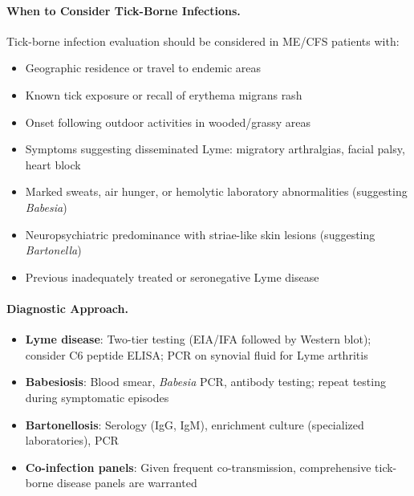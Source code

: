 \paragraph{When to Consider Tick-Borne Infections.}
Tick-borne infection evaluation should be considered in ME/CFS patients with:
\begin{itemize}
    \item Geographic residence or travel to endemic areas
    \item Known tick exposure or recall of erythema migrans rash
    \item Onset following outdoor activities in wooded/grassy areas
    \item Symptoms suggesting disseminated Lyme: migratory arthralgias, facial palsy, heart block
    \item Marked sweats, air hunger, or hemolytic laboratory abnormalities (suggesting \emph{Babesia})
    \item Neuropsychiatric predominance with striae-like skin lesions (suggesting \emph{Bartonella})
    \item Previous inadequately treated or seronegative Lyme disease
\end{itemize}

\paragraph{Diagnostic Approach.}
\begin{itemize}
    \item \textbf{Lyme disease}: Two-tier testing (EIA/IFA followed by Western blot); consider C6 peptide ELISA; PCR on synovial fluid for Lyme arthritis
    \item \textbf{Babesiosis}: Blood smear, \emph{Babesia} PCR, antibody testing; repeat testing during symptomatic episodes
    \item \textbf{Bartonellosis}: Serology (IgG, IgM), enrichment culture (specialized laboratories), PCR
    \item \textbf{Co-infection panels}: Given frequent co-transmission, comprehensive tick-borne disease panels are warranted
\end{itemize}

